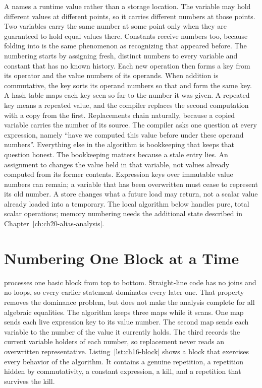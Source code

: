 A  names a runtime value rather than a storage location.
The variable  may hold different values at different points, so it carries different numbers at those points.
Two variables carry the same number at some point only when they are guaranteed to hold equal values there.
Constants receive numbers too, because folding  into  is the same phenomenon as recognizing that  appeared before.
The numbering starts by assigning fresh, distinct numbers to every variable and constant that has no known history.
Each new operation then forms a key from its operator and the value numbers of its operands.
When addition is commutative, the key sorts its operand numbers so that  and  form the same key.
A hash table maps each key seen so far to the number it was given.
A repeated key means a repeated value, and the compiler replaces the second computation with a copy from the first.
Replacements chain naturally, because a copied variable carries the number of its source.
The compiler asks one question at every expression, namely \enquote{have we computed this value before under these operand numbers}.
Everything else in the algorithm is bookkeeping that keeps that question honest.
The bookkeeping matters because a stale entry lies.
An assignment to  changes the value held in that variable, not values already computed from its former contents.
Expression keys over immutable value numbers can remain; a variable that has been overwritten must cease to represent its old number.
A store changes what a future load may return, not a scalar value already loaded into a temporary.
The local algorithm below handles pure, total scalar operations; memory numbering needs the additional state described in Chapter~\ref{ch:ch20-alias-analysis}.

\section{Numbering One Block at a Time}
\label{sec:ch16-local-numbering}

 processes one basic block from top to bottom.
Straight-line code has no joins and no loops, so every earlier statement dominates every later one.
That property removes the dominance problem, but does not make the analysis complete for all algebraic equalities.
The algorithm keeps three maps while it scans.
One map sends each live expression key to its value number.
The second map sends each variable to the number of the value it currently holds.
The third records the current variable holders of each number, so replacement never reads an overwritten representative.
Listing~\ref{lst:ch16-block} shows a block that exercises every behavior of the algorithm.
It contains a genuine repetition, a repetition hidden by commutativity, a constant expression, a kill, and a repetition that survives the kill.

